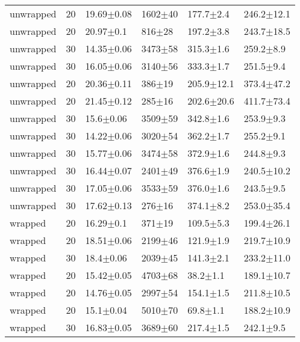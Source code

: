 \begin{tabular}{lrllll}
    unwrapped &      20 &   19.69$\pm$0.08 &  1602$\pm$40 &   177.7$\pm$2.4 &  246.2$\pm$12.1 \\
    unwrapped &      20 &    20.97$\pm$0.1 &   816$\pm$28 &   197.2$\pm$3.8 &  243.7$\pm$18.5 \\
    unwrapped &      30 &   14.35$\pm$0.06 &  3473$\pm$58 &   315.3$\pm$1.6 &   259.2$\pm$8.9 \\
    unwrapped &      30 &   16.05$\pm$0.06 &  3140$\pm$56 &   333.3$\pm$1.7 &   251.5$\pm$9.4 \\
    unwrapped &      20 &   20.36$\pm$0.11 &   386$\pm$19 &  205.9$\pm$12.1 &  373.4$\pm$47.2 \\
    unwrapped &      20 &   21.45$\pm$0.12 &   285$\pm$16 &  202.6$\pm$20.6 &  411.7$\pm$73.4 \\
    unwrapped &      30 &    15.6$\pm$0.06 &  3509$\pm$59 &   342.8$\pm$1.6 &   253.9$\pm$9.3 \\
    unwrapped &      30 &   14.22$\pm$0.06 &  3020$\pm$54 &   362.2$\pm$1.7 &   255.2$\pm$9.1 \\
    unwrapped &      30 &   15.77$\pm$0.06 &  3474$\pm$58 &   372.9$\pm$1.6 &   244.8$\pm$9.3 \\
    unwrapped &      30 &   16.44$\pm$0.07 &  2401$\pm$49 &   376.6$\pm$1.9 &  240.5$\pm$10.2 \\
    unwrapped &      30 &   17.05$\pm$0.06 &  3533$\pm$59 &   376.0$\pm$1.6 &   243.5$\pm$9.5 \\
    unwrapped &      30 &   17.62$\pm$0.13 &   276$\pm$16 &   374.1$\pm$8.2 &  253.0$\pm$35.4 \\
      wrapped &      20 &    16.29$\pm$0.1 &   371$\pm$19 &   109.5$\pm$5.3 &  199.4$\pm$26.1 \\
      wrapped &      20 &   18.51$\pm$0.06 &  2199$\pm$46 &   121.9$\pm$1.9 &  219.7$\pm$10.9 \\
      wrapped &      30 &    18.4$\pm$0.06 &  2039$\pm$45 &   141.3$\pm$2.1 &  233.2$\pm$11.0 \\
      wrapped &      20 &   15.42$\pm$0.05 &  4703$\pm$68 &    38.2$\pm$1.1 &  189.1$\pm$10.7 \\
      wrapped &      20 &   14.76$\pm$0.05 &  2997$\pm$54 &   154.1$\pm$1.5 &  211.8$\pm$10.5 \\
      wrapped &      20 &    15.1$\pm$0.04 &  5010$\pm$70 &    69.8$\pm$1.1 &  188.2$\pm$10.9 \\
      wrapped &      30 &   16.83$\pm$0.05 &  3689$\pm$60 &   217.4$\pm$1.5 &   242.1$\pm$9.5 \\

\end{tabular}
